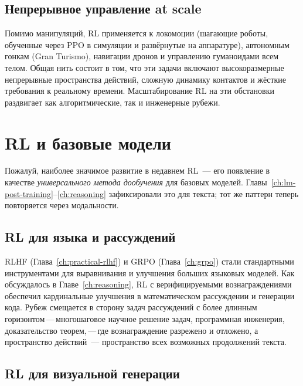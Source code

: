 \subsection{Непрерывное управление at scale}

Помимо манипуляций, RL применяется к локомоции (шагающие
роботы, обученные через PPO в симуляции и развёрнутые на аппаратуре),
автономным гонкам (Gran Turismo), навигации дронов и управлению
гуманоидами всем телом. Общая нить состоит в том, что эти задачи включают
высокоразмерные непрерывные пространства действий, сложную динамику контактов
и жёсткие требования к реальному времени. Масштабирование RL на эти обстановки
раздвигает как алгоритмические, так и инженерные рубежи.


\section{RL и базовые модели}
\label{sec:open-foundation}

Пожалуй, наиболее значимое развитие в недавнем RL~--- его появление
в качестве \emph{универсального метода дообучения} для базовых
моделей. Главы~\ref{ch:lm-post-training}--\ref{ch:reasoning}
зафиксировали это для текста; тот же паттерн теперь повторяется через
модальности.

\subsection{RL для языка и рассуждений}

RLHF (Глава~\ref{ch:practical-rlhf}) и GRPO (Глава~\ref{ch:grpo}) стали
стандартными инструментами для выравнивания и улучшения больших языковых моделей.
Как обсуждалось в Главе~\ref{ch:reasoning}, RL с верифицируемыми вознаграждениями
обеспечил кардинальные улучшения в математическом рассуждении и генерации кода.
Рубеж смещается в сторону задач рассуждений с более длинным горизонтом\,---\,многошаговое
научное решение задач, программная инженерия, доказательство теорем,\,---\,где
вознаграждение разрежено и отложено, а пространство действий~--- пространство
всех возможных продолжений текста.

\subsection{RL для визуальной генерации}

